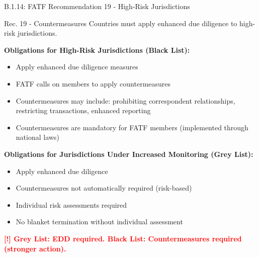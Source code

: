 \documentclass[11pt,a4paper]{beamer}
\newcommand{\redflag}[1]{\textcolor{red}{\textbf{[!] #1}}}
\begin{document}
	\begin{frame}{B.1.14: FATF Recommendation 19 - High-Risk Jurisdictions}
		\begin{block}{Rec. 19 - Countermeasures}
			Countries must apply enhanced due diligence to high-risk jurisdictions.
		\end{block}
		\textbf{Obligations for High-Risk Jurisdictions (Black List):}
		\begin{itemize}
			\item Apply enhanced due diligence measures
			\item FATF calls on members to apply countermeasures
			\item Countermeasures may include: prohibiting correspondent relationships, restricting transactions, enhanced reporting
			\item Countermeasures are mandatory for FATF members (implemented through national laws)
		\end{itemize}
		\textbf{Obligations for Jurisdictions Under Increased Monitoring (Grey List):}
		\begin{itemize}
			\item Apply enhanced due diligence
			\item Countermeasures not automatically required (risk-based)
			\item Individual risk assessments required
			\item No blanket termination without individual assessment
		\end{itemize}
		\redflag{Grey List: EDD required. Black List: Countermeasures required (stronger action).}
	\end{frame}
	
\end{document}
